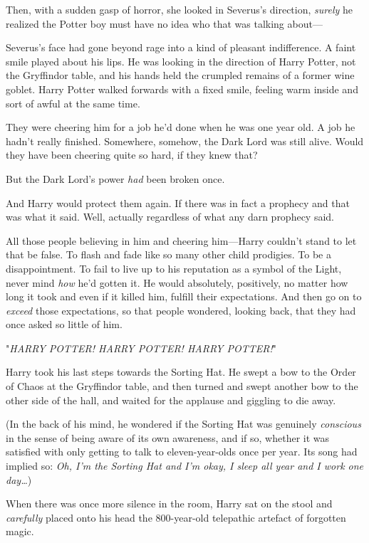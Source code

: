 Then, with a sudden gasp of horror, she looked in Severus's direction, 
\emph{surely} he realized the Potter boy must have no idea who that was talking 
about---

Severus's face had gone beyond rage into a kind of pleasant indifference. A 
faint smile played about his lips. He was looking in the direction of Harry 
Potter, not the Gryffindor table, and his hands held the crumpled remains of a 
former wine goblet.
\sbreak
Harry Potter walked forwards with a fixed smile, feeling warm inside and sort 
of awful at the same time.

They were cheering him for a job he'd done when he was one year old. A job he 
hadn't really finished. Somewhere, somehow, the Dark Lord was still alive. 
Would they have been cheering quite so hard, if they knew that?

But the Dark Lord's power \emph{had} been broken once.

And Harry would protect them again. If there was in fact a prophecy and that 
was what it said. Well, actually regardless of what any darn prophecy said.

All those people believing in him and cheering him---Harry couldn't stand to 
let that be false. To flash and fade like so many other child prodigies. To be 
a disappointment. To fail to live up to his reputation as a symbol of the 
Light, never mind \emph{how} he'd gotten it. He would absolutely, positively, 
no matter how long it took and even if it killed him, fulfill their 
expectations. And then go on to \emph{exceed} those expectations, so that 
people wondered, looking back, that they had once asked so little of him.

"\emph{HARRY POTTER! HARRY POTTER! HARRY POTTER!}"

Harry took his last steps towards the Sorting Hat. He swept a bow to the Order 
of Chaos at the Gryffindor table, and then turned and swept another bow to the 
other side of the hall, and waited for the applause and giggling to die away.

(In the back of his mind, he wondered if the Sorting Hat was genuinely 
\emph{conscious} in the sense of being aware of its own awareness, and if so, 
whether it was satisfied with only getting to talk to eleven-year-olds once per 
year. Its song had implied so: \emph{Oh, I'm the Sorting Hat and I'm okay, I 
sleep all year and I work one day{\ldots}})

When there was once more silence in the room, Harry sat on the stool and 
\emph{carefully} placed onto his head the 800-year-old telepathic artefact of 
forgotten magic.

